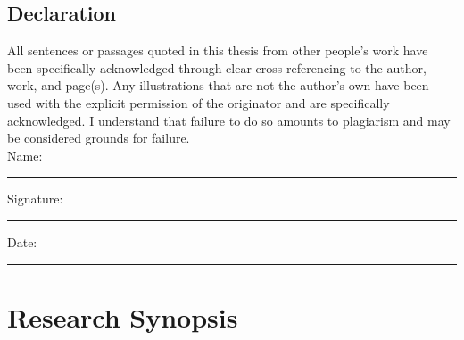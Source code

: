 \documentclass[12pt,oneside]{book}
\begin{document}

\newpage
\section*{\Large Declaration}

All sentences or passages quoted in this thesis from other people's work have been specifically acknowledged through clear cross-referencing to the author, work, and page(s). Any illustrations that are not the author's own have been used with the explicit permission of the originator and are specifically acknowledged. I understand that failure to do so amounts to plagiarism and may be considered grounds for failure.\\[1cm]

\noindent Name:\\[1mm]
\rule[1em]{25em}{0.5pt}

\noindent Signature:\\[1mm]
\rule[1em]{25em}{0.5pt}

\noindent Date:\\[1mm]
\rule[1em]{25em}{0.5pt}

% 

% 


\chapter*{Research Synopsis}
\end{document}
